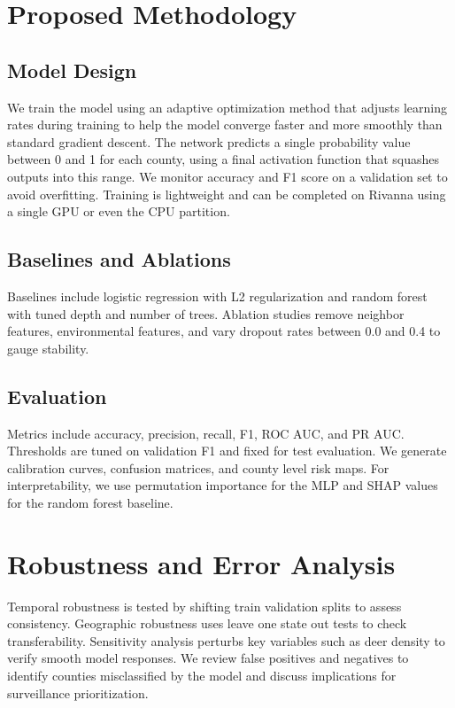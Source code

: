 \documentclass[conference]{IEEEtran}
\begin{document}
\section{Proposed Methodology}
\subsection{Model Design}
We train the model using an adaptive optimization method that adjusts learning rates during training to help the model converge faster and more smoothly than standard gradient descent. The network predicts a single probability value between 0 and 1 for each county, using a final activation function that squashes outputs into this range. We monitor accuracy and F1 score on a validation set to avoid overfitting. Training is lightweight and can be completed on Rivanna using a single GPU or even the CPU partition.

\subsection{Baselines and Ablations}
Baselines include logistic regression with L2 regularization and random forest with tuned depth and number of trees.  
Ablation studies remove neighbor features, environmental features, and vary dropout rates between 0.0 and 0.4 to gauge stability.

\subsection{Evaluation}
Metrics include accuracy, precision, recall, F1, ROC AUC, and PR AUC. Thresholds are tuned on validation F1 and fixed for test evaluation. We generate calibration curves, confusion matrices, and county level risk maps. For interpretability, we use permutation importance for the MLP and SHAP values for the random forest baseline.

\section{Robustness and Error Analysis}
Temporal robustness is tested by shifting train validation splits to assess consistency. Geographic robustness uses leave one state out tests to check transferability. Sensitivity analysis perturbs key variables such as deer density to verify smooth model responses. We review false positives and negatives to identify counties misclassified by the model and discuss implications for surveillance prioritization.
\end{document}
